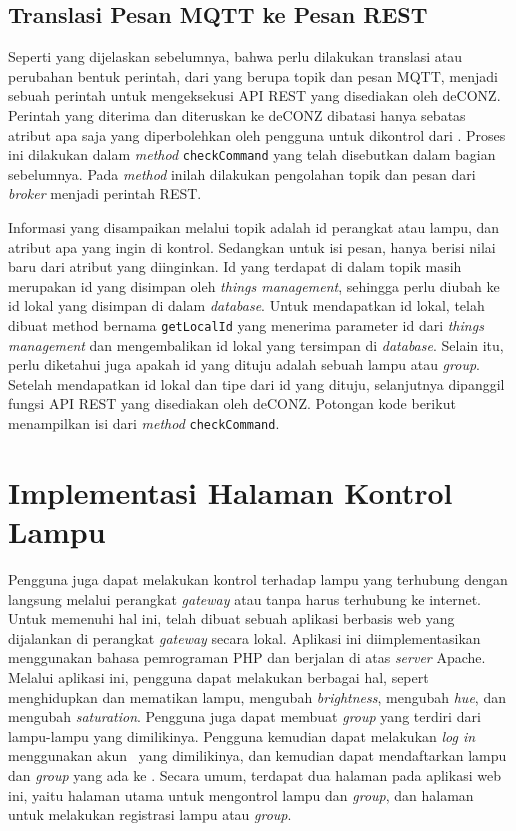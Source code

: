 \subsection{Translasi Pesan MQTT ke Pesan REST}
Seperti yang dijelaskan sebelumnya, bahwa perlu dilakukan translasi atau perubahan bentuk perintah, dari yang berupa topik dan pesan MQTT, menjadi sebuah perintah untuk mengeksekusi API REST yang disediakan oleh deCONZ. Perintah yang diterima dan diteruskan ke deCONZ dibatasi hanya sebatas atribut apa saja yang diperbolehkan oleh pengguna untuk dikontrol dari \plat. Proses ini dilakukan dalam \textit{method} \texttt{checkCommand} yang telah disebutkan dalam bagian sebelumnya. Pada \textit{method} inilah dilakukan pengolahan topik dan pesan dari \textit{broker} menjadi perintah REST.

Informasi yang disampaikan melalui topik adalah id perangkat atau lampu, dan atribut apa yang ingin di kontrol. Sedangkan untuk isi pesan, hanya berisi nilai baru dari atribut yang diinginkan. Id yang terdapat di dalam topik masih merupakan id yang disimpan oleh \textit{things management}, sehingga perlu diubah ke id lokal yang disimpan di dalam \textit{database}. Untuk mendapatkan id lokal, telah dibuat method bernama \texttt{getLocalId} yang menerima parameter id dari \textit{things management} dan mengembalikan id lokal yang tersimpan di \textit{database}. Selain itu, perlu diketahui juga apakah id yang dituju adalah sebuah lampu atau \textit{group}. Setelah mendapatkan id lokal dan tipe dari id yang dituju, selanjutnya dipanggil fungsi API REST yang disediakan oleh deCONZ. Potongan kode berikut menampilkan isi dari \textit{method} \texttt{checkCommand}.



\section{Implementasi Halaman Kontrol Lampu}
Pengguna juga dapat melakukan kontrol terhadap lampu yang terhubung dengan langsung melalui perangkat \textit{gateway} atau tanpa harus terhubung ke internet. Untuk memenuhi hal ini, telah dibuat sebuah aplikasi berbasis web yang dijalankan di perangkat \textit{gateway} secara lokal. Aplikasi ini diimplementasikan menggunakan bahasa pemrograman PHP dan berjalan di atas \textit{server} Apache. Melalui aplikasi ini, pengguna dapat melakukan berbagai hal, sepert menghidupkan dan mematikan lampu, mengubah \textit{brightness}, mengubah \textit{hue}, dan mengubah \textit{saturation}. Pengguna juga dapat membuat \textit{group} yang terdiri dari lampu-lampu yang dimilikinya. Pengguna kemudian dapat melakukan \textit{log in} menggunakan akun \plat~yang dimilikinya, dan kemudian dapat mendaftarkan lampu dan \textit{group} yang ada ke \plat. Secara umum, terdapat dua halaman pada aplikasi web ini, yaitu halaman utama untuk mengontrol lampu dan \textit{group}, dan halaman untuk melakukan registrasi lampu atau \textit{group}.

